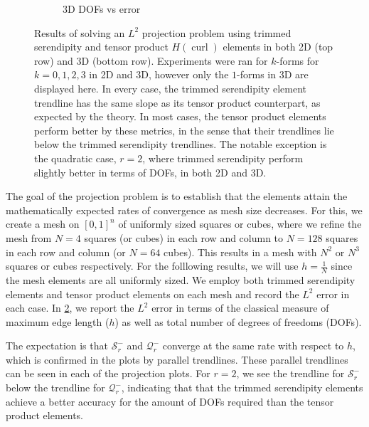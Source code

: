\documentclass[format=acmsmall,screen,timestamp=false,a4paper]{acmart}
\DeclareMathOperator{\curl}{curl}
\newcommand{\hcurl}{\ensuremath{{H}(\curl)}\xspace}
\begin{document}
\begin{figure}[htbp]
\begin{subfigure}[h]{0.48\textwidth}
    \caption{3D DOFs vs error\label{fig:3dProjectionDofs}}
  \end{subfigure}
  \caption{Results of solving an $L^2$ projection problem using trimmed serendipity and tensor product \hcurl elements in both 2D (top row) and 3D (bottom row).  Experiments were ran for $k$-forms for $k=0,1,2,3$ in 2D and 3D, however only the $1$-forms in 3D are displayed here.  In every case, the trimmed serendipity element trendline has the same slope as its tensor product counterpart, as expected by the theory.  In most cases, the tensor product elements perform better by these metrics, in the sense that their trendlines lie below the trimmed serendipity trendlines.  The notable exception is the quadratic case, $r=2$, where trimmed serendipity perform slightly better in terms of DOFs, in both 2D and 3D.\label{Projections}} 
\end{figure}

The goal of the projection problem is to establish that the elements attain the mathematically expected rates of convergence as mesh size decreases.  For this, we create a mesh on $[0,1]^n$ of uniformly sized squares or cubes, where we refine the mesh from $N=4$ squares (or cubes) in each row and column to $N=128$ squares in each row and column (or $N=64$ cubes).  This results in a mesh with $N^2$ or $N^3$ squares or cubes respectively.  For the folllowing results, we will use $h = \frac{1}{N}$ since the mesh elements are all uniformly sized. 
We employ both trimmed serendipity elements and tensor product elements on each mesh and record the $L^2$ error in each case.  In \cref{Projections}, we report the $L^2$ error in terms of the classical measure of maximum edge length ($h$) as well as total number of degrees of freedoms (DOFs).

The expectation is that $\mathcal{S}^-_r$ and $\mathcal{Q}^-_r$ converge at the same rate with respect to $h$, which is confirmed in the plots by parallel trendlines.  These parallel trendlines can be seen in each of the projection plots.  For $r=2$, we see the trendline for $\mathcal{S}^-_r$ below the trendline for $\mathcal{Q}^-_r$, indicating that that the trimmed serendipity elements achieve a better accuracy for the amount of DOFs required than the tensor product elements.  
\end{document}
